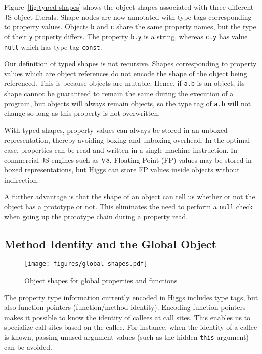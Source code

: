 \documentclass[preprint]{sigplanconf}
\begin{document}
Figure~\ref{fig:typed-shapes} shows the object shapes associated with three
different JS object literals. Shape nodes are now annotated with type tags
corresponding to property values. Objects {\tt b} and {\tt c} share the same
property names, but the type of their {\tt y} property differs. The property
{\tt b.y} is a string, whereas {\tt c.y} has value {\tt null} which has type
tag {\tt const}.

Our definition of typed shapes is not recursive. Shapes corresponding to
property values which are object references do not encode the shape of the
object being referenced. This is because objects are mutable. Hence, if
{\tt a.b} is an object, its shape cannot be guaranteed to remain the same
during the execution of a program, but objects will always remain objects,
so the type tag of {\tt a.b} will not change so long as this property is
not overwritten.

With typed shapes, property values can always be stored in an unboxed
representation, thereby avoiding boxing and unboxing overhead.
In the optimal case, properties can be read and written in a single machine
instruction. In commercial JS engines such as V8, Floating Point (FP)
values may be stored in boxed representations, but Higgs can store FP
values inside objects without indirection.

A further advantage is that the shape of an object can tell us whether or not
the object has a prototype or not. This eliminates the need to perform a
{\tt null} check when going up the prototype chain during a property read.

\subsection{Method Identity and the Global Object}\label{sec:method}

\begin{figure}[tb]
\begin{center}
\texttt{[image: figures/global-shapes.pdf]}
\end{center}
\caption{Object shapes for global properties and functions\label{fig:global-shapes}}
\end{figure}

The property type information currently encoded in Higgs includes type tags,
but also function pointers (function/method identity). Encoding function
pointers makes it possible to know the identity of callees at call sites.
This enables us to specialize call sites based on the callee.
For instance, when the identity of a callee is known, passing
unused argument values (such as the hidden {\tt this} argument) can be
avoided.
\end{document}
